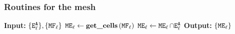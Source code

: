 \documentclass[a4paper]{siamltex1213}
\newcommand{\activeelements}[1]{\tt E^A_{#1}}
\DeclareMathOperator\mesh{\texttt{MESH}}
\DeclareMathOperator\basis{\texttt{SPACE}}
\DeclareMathOperator\marked{\tt MARKED}
\DeclareMathOperator\newcells{\tt NE}
\DeclareMathOperator\markedelements{\tt ME}
\DeclareMathOperator\functionstoremove{\tt MF}
\newcommand\QQ{\mathcal Q}
\begin{document}

\subsubsection{Routines for the mesh} \mbox{}

% 
% 



\begin{algorithm}
\caption{$\texttt{compute\_cells\_to\_refine}$}
\begin{algorithmic}[1]
\Statex \textbf{Input:} $\{\activeelements{\ell}\}, \{\functionstoremove_\ell\}$
 \State $\markedelements_\ell \gets \textbf{get\_cells} \, (\functionstoremove_\ell)$
 \State $\markedelements_\ell \gets \markedelements_\ell\cap \activeelements{\ell}$
\EndFor
\Statex \textbf{Output:} $\{\markedelements_\ell\}$
\end{algorithmic}
\end{algorithm}
\end{document}
